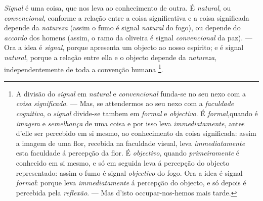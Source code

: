  
\emph{Signal} é uma coisa, que nos leva ao conhecimento de outra. É \emph{natural}, ou \emph{convencional}, conforme a relação entre a coisa significativa e a coisa significada depende da \emph{natureza} (assim o fumo é signal \emph{natural} do fogo), ou depende do \emph{accordo} dos homens (assim, o ramo da oliveira é signal \emph{convencional} da paz). --- Ora a idea é \emph{signal}, porque apresenta um objecto ao nosso espirito; e é signal \emph{natural}, porque a relação entre ella e o objecto depende da \emph{natureza}, independentemente de toda a convenção humana \footnote{A divisão do \emph{signal} em \emph{natural} e \emph{convencional} funda-se no seu nexo com a \emph{coisa significada}. --- Mas, se attendermos ao seu nexo com a \emph{faculdade cognitiva}, o \emph{signal} divide-se tambem em \emph{formal} e \emph{objectivo}. É \emph{formal},quando é \emph{imagem} e \emph{semelhança} de uma coisa e por isso leva \emph{immediatamente}, antes d'elle ser percebido em si mesmo, ao conhecimento da coisa significada: assim a imagem de uma flor, recebida na faculdade visual, leva \emph{immediatamente} esta faculdade á percepção da flor. É \emph{objectivo}, quando \emph{primeiramente} é conhecido em si mesmo, e só em seguida leva á percepção do objecto representado: assim o fumo é signal \emph{objectivo} do fogo. Ora a idea é signal \emph{formal}: porque leva \emph{immediatamente} á percepção do objecto, e só depois é percebida pela \emph{reflexão}. --- Mas d'isto occupar-nos-hemos mais tarde.}.


